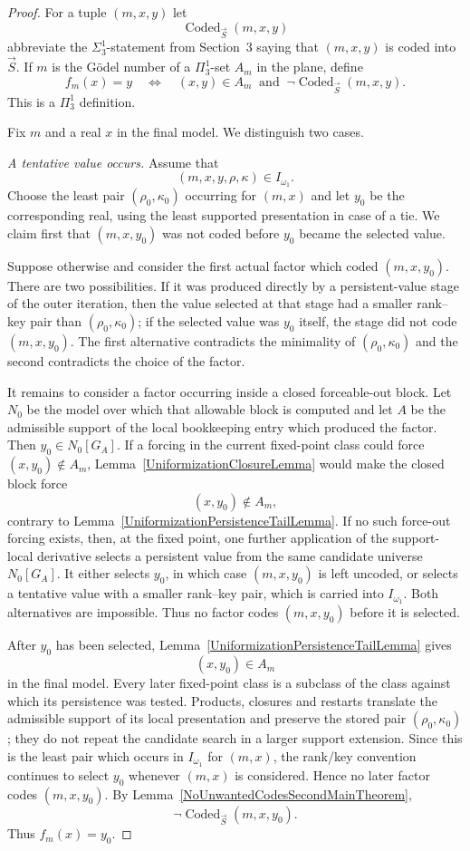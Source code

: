 \documentclass[10pt,a4paper]{amsart}
\begin{document}
\begin{proof}
For a tuple $(m,x,y)$ let
\[
\operatorname{Coded}_{\vec S}(m,x,y)
\]
abbreviate the $\Sigma^1_3$-statement from Section~3 saying that $(m,x,y)$ is coded into $\vec S$. If $m$ is the G\"odel number of a $\Pi^1_3$-set $A_m$ in the plane, define
\[
f_m(x)=y
\quad\Longleftrightarrow\quad
(x,y)\in A_m
\ \text{ and }\
\neg\operatorname{Coded}_{\vec S}(m,x,y).
\]
This is a $\Pi^1_3$ definition.

Fix $m$ and a real $x$ in the final model. We distinguish two cases.

\medskip
\noindent
\emph{A tentative value occurs.}
Assume that
\[
(m,x,y,\rho,\kappa)\in I_{\omega_1}.
\]
Choose the least pair $(\rho_0,\kappa_0)$ occurring for $(m,x)$ and let $y_0$ be the corresponding real, using the least supported presentation in case of a tie. We claim first that $(m,x,y_0)$ was not coded before $y_0$ became the selected value.

Suppose otherwise and consider the first actual factor which coded $(m,x,y_0)$. There are two possibilities. If it was produced directly by a persistent-value stage of the outer iteration, then the value selected at that stage had a smaller rank--key pair than $(\rho_0,\kappa_0)$; if the selected value was $y_0$ itself, the stage did not code $(m,x,y_0)$. The first alternative contradicts the minimality of $(\rho_0,\kappa_0)$ and the second contradicts the choice of the factor.

It remains to consider a factor occurring inside a closed forceable-out block. Let $N_0$ be the model over which that allowable block is computed and let $A$ be the admissible support of the local bookkeeping entry which produced the factor. Then $y_0\in N_0[G_A]$. If a forcing in the current fixed-point class could force $(x,y_0)\notin A_m$, Lemma~\ref{UniformizationClosureLemma} would make the closed block force
\[
(x,y_0)\notin A_m,
\]
contrary to Lemma~\ref{UniformizationPersistenceTailLemma}. If no such force-out forcing exists, then, at the fixed point, one further application of the support-local derivative selects a persistent value from the same candidate universe $N_0[G_A]$. It either selects $y_0$, in which case $(m,x,y_0)$ is left uncoded, or selects a tentative value with a smaller rank--key pair, which is carried into $I_{\omega_1}$. Both alternatives are impossible. Thus no factor codes $(m,x,y_0)$ before it is selected.

After $y_0$ has been selected, Lemma~\ref{UniformizationPersistenceTailLemma} gives
\[
(x,y_0)\in A_m
\]
in the final model. Every later fixed-point class is a subclass of the class against which its persistence was tested. Products, closures and restarts translate the admissible support of its local presentation and preserve the stored pair $(\rho_0,\kappa_0)$; they do not repeat the candidate search in a larger support extension. Since this is the least pair which occurs in $I_{\omega_1}$ for $(m,x)$, the rank/key convention continues to select $y_0$ whenever $(m,x)$ is considered. Hence no later factor codes $(m,x,y_0)$. By Lemma~\ref{NoUnwantedCodesSecondMainTheorem},
\[
\neg\operatorname{Coded}_{\vec S}(m,x,y_0).
\]
Thus $f_m(x)=y_0$.


\end{proof}
\end{document}
